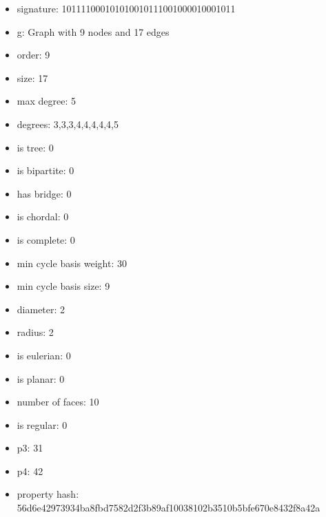 \newpage
\begin{figure}
\end{figure}
\begin{itemize}
\item signature: 101111000101010010111001000010001011
\item g: Graph with 9 nodes and 17 edges
\item order: 9
\item size: 17
\item max degree: 5
\item degrees: 3,3,3,4,4,4,4,4,5
\item is tree: 0
\item is bipartite: 0
\item has bridge: 0
\item is chordal: 0
\item is complete: 0
\item min cycle basis weight: 30
\item min cycle basis size: 9
\item diameter: 2
\item radius: 2
\item is eulerian: 0
\item is planar: 0
\item number of faces: 10
\item is regular: 0
\item p3: 31
\item p4: 42
\item property hash: 56d6e42973934ba8fbd7582d2f3b89af10038102b3510b5bfe670e8432f8a42a
\end{itemize}
